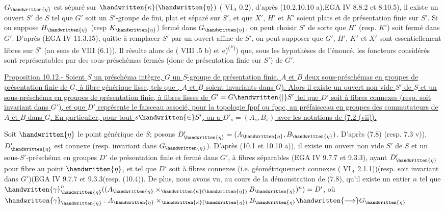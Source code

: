 $G_{\handwritten{\eta}}$ est séparé sur $\handwritten{\kappa}(\handwritten{\eta})$ ( $\mathrm{VI}_A$ 0.2), d'après (10.2,10.10 a),EGA IV 8.8.2 et 8.10.5), il existe un ouvert $S'$ de $S$ tel que $G'$ soit un $S'$-groupe de  fini, plat et séparé sur $S'$, et que $X'$, $H'$ et $K'$ soient plats et de présentation finie sur $S'$. Si on suppose $H_{\handwritten{\eta}}$ (resp $K_{\handwritten{\eta}}$) fermé dans $G_{\handwritten{\eta}}$, on peut choisir $S'$ de sorte que $H'$ (resp. $K'$) soit fermé dans $G'$. D'après (EGA IV 11.3.15), quitte à remplacer $S'$ par un ouvert affine de $S'$, on peut supposer que $G'$, $H'$, $K'$ et $X'$ sont essentiellement libres sur $S'$ (au sens de  VIII (6.1)). Il résulte alors de ( VIII .5 b) et e)\textsuperscript{(*)}) que, sous les hypothèses de l'énoncé, les foncteurs considérés sont représentables par des sous-préschémas fermés (donc de présentation finie sur $S'$) de $G'$.

\uline{Proposition 10.12.- Soient $S$ un préschéma intègre, $G$ un  $S$-groupe de présentation finie, $A$ et $B$ deux sous-préschémas en groupes de présentation finie de $G$, à fibre générique lisse, tels que ,  $A$ et $B$ soient invariants dans $G$). Alors il existe un ouvert non vide $S'$ de $S$ et un sous-préschéma en groupes de présentation finie, à fibres lisses  de $G'=G\handwritten{|}S'$\handwritten{,} tel que $D'$ soit  à fibres connexes (resp. soit invariant dans $G'$), et que $D'$ représente le faisceau associé, pour la topologie fppf ou fpqc, au préfaisceau en groupes des commutateurs de $A$ et $B$ dans $G$. En particulier, pour tout $s\handwritten{\in}S'$, on a $D'_s=(A_s,B_s)$ avec les notations de (7.2 (vii)).}

Soit $\handwritten{\eta}$ le point générique de $S$; posons $D'_{\handwritten{\eta}}=(A_{\handwritten{\eta}},B_{\handwritten{\eta}})$. D'après (7.8) (resp. 7.3 v)), $D'_{\handwritten{\eta}}$ est connexe (resp. invariant dans $G_{\handwritten{\eta}}$). D'après (10.1 et 10.10 a)), il existe un ouvert non vide $S'$ de $S$ et un sous-$S'$-préschéma en groupes $D'$ de présentation finie et fermé dans $G'$, à fibres séparables (EGA IV 9.7.7 et 9.3.3), ayant $D'_{\handwritten{\eta}}$ pour fibre au point $\handwritten{\eta}$, et tel que $D'$ soit à fibres connexes (i.e. géométriquement connexes ( $\mathrm{VI}_A$ 2.1.1))(resp. soit invariant dans $G'$)(EGA IV 9.7.7 et 9.3.3\inserted{\handwritten{,}}(resp. (10.4)). De plus, nous avons vu, au cours de la démonstration de (7.8), qu'il existe un entier $n$ tel que $\handwritten{\gamma}_{\handwritten{\eta}}^n((A_{\handwritten{\eta}}\times_{\handwritten{\kappa}(\handwritten{\eta})}B_{\handwritten{\eta}})^n)=D'$, où $\handwritten{\gamma}_{\handwritten{\eta}}:A_{\handwritten{\eta}}\times_{\handwritten{\kappa}(\handwritten{\eta})}B_{\handwritten{\eta}}\handwritten{\longrightarrow}G_{\handwritten{\eta}}$

\par\noindent\handwritten{\rule{\linewidth}{0.3pt}}\par
{}\par
